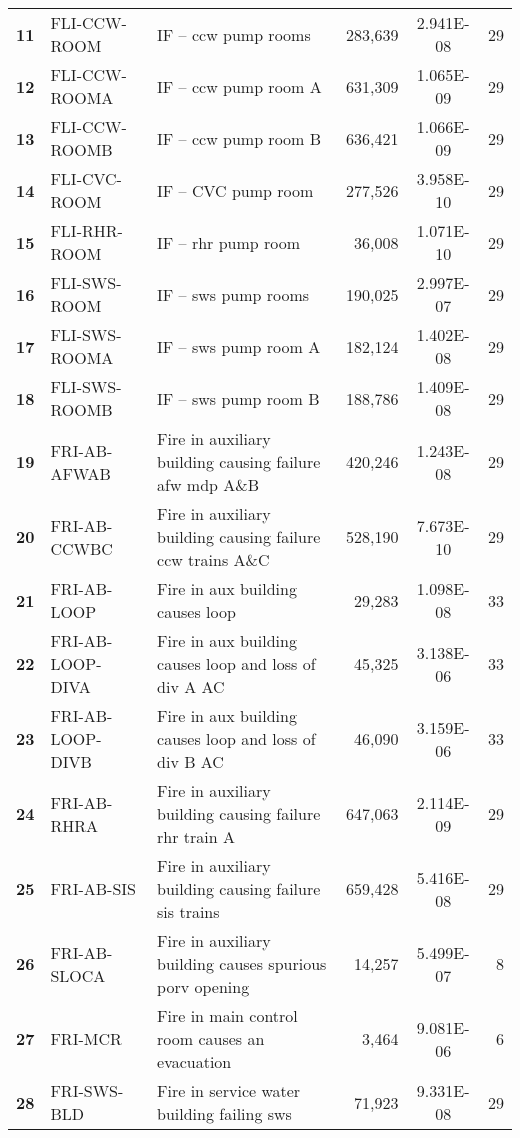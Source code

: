 \begin{longtable}{@{}lllrSr@{}}
\textbf{11} & FLI-CCW-ROOM     & IF -- \acrshort{ccw} pump rooms & 283,639   & 2.941E-08 & 29 \\
\textbf{12} & FLI-CCW-ROOMA    & IF -- \acrshort{ccw} pump room A & 631,309   & 1.065E-09 & 29 \\
\textbf{13} & FLI-CCW-ROOMB    & IF -- \acrshort{ccw} pump room B & 636,421   & 1.066E-09 & 29 \\
\textbf{14} & FLI-CVC-ROOM     & IF -- CVC pump room & 277,526   & 3.958E-10 & 29 \\
\textbf{15} & FLI-RHR-ROOM     & IF -- \acrshort{rhr} pump room & 36,008    & 1.071E-10 & 29 \\
\textbf{16} & FLI-SWS-ROOM     & IF -- \acrshort{sws} pump rooms & 190,025   & 2.997E-07 & 29 \\
\textbf{17} & FLI-SWS-ROOMA    & IF -- \acrshort{sws} pump room A & 182,124   & 1.402E-08 & 29 \\
\textbf{18} & FLI-SWS-ROOMB    & IF -- \acrshort{sws} pump room B & 188,786   & 1.409E-08 & 29 \\
\textbf{19} & FRI-AB-AFWAB     & Fire in auxiliary building causing failure \acrshort{afw} \acrshort{mdp} A\&B & 420,246   & 1.243E-08 & 29 \\
\textbf{20} & FRI-AB-CCWBC     & Fire in auxiliary building causing failure \acrshort{ccw} trains A\&C & 528,190   & 7.673E-10 & 29 \\
\textbf{21} & FRI-AB-LOOP      & Fire in aux building causes \acrshort{loop} & 29,283    & 1.098E-08 & 33 \\
\textbf{22} & FRI-AB-LOOP-DIVA & Fire in aux building causes \acrshort{loop} and loss of div A AC & 45,325    & 3.138E-06 & 33 \\
\textbf{23} & FRI-AB-LOOP-DIVB & Fire in aux building causes \acrshort{loop} and loss of div B AC & 46,090    & 3.159E-06 & 33 \\
\textbf{24} & FRI-AB-RHRA      & Fire in auxiliary building causing failure \acrshort{rhr} train A & 647,063   & 2.114E-09 & 29 \\
\textbf{25} & FRI-AB-SIS       & Fire in auxiliary building causing failure \acrshort{sis} trains & 659,428   & 5.416E-08 & 29 \\
\textbf{26} & FRI-AB-SLOCA     & Fire in auxiliary building causes spurious \acrshort{porv} opening & 14,257    & 5.499E-07 & 8  \\
\textbf{27} & FRI-MCR          & Fire in main control room causes an evacuation & 3,464     & 9.081E-06 & 6  \\
\textbf{28} & FRI-SWS-BLD      & Fire in service water building failing \acrshort{sws} & 71,923    & 9.331E-08 & 29 \\

\end{longtable}

